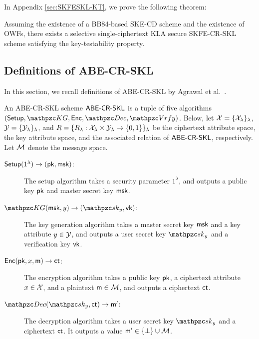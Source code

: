 In Appendix \ref{sec:SKFESKL-KT}, we prove the following theorem:

\begin{theorem}
Assuming the existence of a BB84-based SKE-CD scheme and the existence
of OWFs, there exists a selective single-ciphertext KLA secure
SKFE-CR-SKL scheme satisfying the key-testability property.
\end{theorem}

\subsection{Definitions of ABE-CR-SKL}\label{sec:ABE_SKL_def}

In this section, we recall definitions of ABE-CR-SKL by Agrawal et al.~\cite{EC:AKNYY23}.

\begin{definition}
An ABE-CR-SKL scheme $\mathsf{ABE}\textrm{-}\mathsf{CR}\textrm{-}\mathsf{SKL}$ is a tuple of five algorithms $(\Setup,
\qKG, \Enc, \qDec,\allowbreak\qVrfy)$.
Below, let $\mathcal{X} = \{ \mathcal{X}_\lambda \}_\lambda$, $\mathcal{Y}= \{ \mathcal{Y}_\lambda
\}_\lambda$, and $R= \{ R_\lambda: \mathcal{X}_\lambda \times \mathcal{Y}_\lambda \to \{0,1\}
\}_\lambda$ be the ciphertext attribute space, the key attribute
space, and the associated relation of $\mathsf{ABE}\textrm{-}\mathsf{CR}\textrm{-}\mathsf{SKL}$, respectively. Let
$\mathcal{M}$ denote the message space.

\begin{description}
\item[$\mathsf{Setup}(1^\lambda)\rightarrow(\mathsf{pk},\mathsf{msk})$:] The setup algorithm takes a security parameter $1^\lambda$, and outputs a public key $\mathsf{pk}$ and master secret key $\mathsf{msk}$.
\item[$\qKG(\msk,y)\ra(\qsk_y,\vk)$:] The key generation algorithm
    takes a master secret key $\mathsf{msk}$ and a key attribute $y \in
    \mathcal{Y}$, and outputs a user secret key $\qsk_y$ and a verification key $\mathsf{vk}$.



\item[$\mathsf{Enc}(\mathsf{pk},x,\mathsf{m})\rightarrow\mathsf{ct}$:] The encryption algorithm takes a public key $\mathsf{pk}$, a ciphertext attribute $x\in \mathcal{X}$, and a plaintext $\mathsf{m}\in\mathcal{M}$, and outputs a ciphertext $\mathsf{ct}$.

\item[$\qDec(\qsk_y,\ct)\ra \msg^\prime$:] The decryption algorithm
takes a user secret key $\qsk_y$ and a ciphertext $\mathsf{ct}$. It outputs
a value $\mathsf{m}^\prime\in \{\bot\}\cup \mathcal{M}$.


\end{description}
\end{definition}
